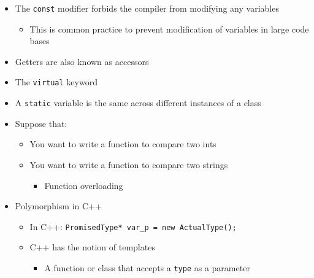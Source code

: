 \begin{itemize}

  \item The \texttt{const} modifier forbids the compiler from modifying any variables

    \begin{itemize}

      \item This is common practice to prevent modification of variables in large code bases

    \end{itemize}

  \item Getters are also known as accessors

  \item The \texttt{virtual} keyword

  \item A \texttt{static} variable is the same across different instances of a class

  \item Suppose that:

    \begin{itemize}

      \item You want to write a function to compare two ints

      \item You want to write a function to compare two strings

        \begin{itemize}

          \item Function overloading

        \end{itemize}

    \end{itemize}

  \item Polymorphism in C++

    \begin{itemize}

      \item In C++: \texttt{PromisedType* var\_p = new ActualType();}

      \item C++ has the notion of templates

        \begin{itemize}

          \item A function or class that accepts a \texttt{type} as a parameter


\end{itemize}
\end{itemize}
\end{itemize}
